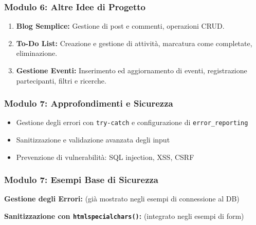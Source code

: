 \documentclass{beamer}
\begin{document}
\begin{frame}
\frametitle{Modulo 6: Altre Idee di Progetto}
\begin{enumerate}
    \item \textbf{Blog Semplice:} Gestione di post e commenti, operazioni CRUD.
    \item \textbf{To-Do List:} Creazione e gestione di attività, marcatura come completate, eliminazione.
    \item \textbf{Gestione Eventi:} Inserimento ed aggiornamento di eventi, registrazione partecipanti, filtri e ricerche.
\end{enumerate}
\end{frame}


\begin{frame}
\frametitle{Modulo 7: Approfondimenti e Sicurezza}
\begin{itemize}
    \item Gestione degli errori con \texttt{try-catch} e configurazione di \texttt{error\_reporting}
    \item Sanitizzazione e validazione avanzata degli input
    \item Prevenzione di vulnerabilità: SQL injection, XSS, CSRF
\end{itemize}
\end{frame}

\begin{frame}[fragile]
\frametitle{Modulo 7: Esempi Base di Sicurezza}
\textbf{Gestione degli Errori:} (già mostrato negli esempi di connessione al DB)
\vspace{1em}

\textbf{Sanitizzazione con \texttt{htmlspecialchars()}:} (integrato negli esempi di form)
\end{frame}
\end{document}

